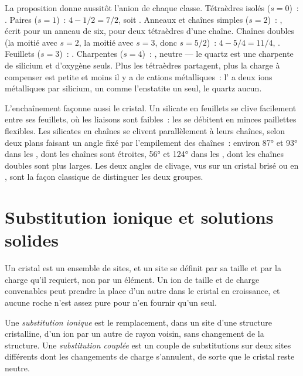 La proposition donne aussitôt l'anion de chaque classe. Tétraèdres isolés
($s = 0$)~: . Paires ($s = 1$)~: $4 - 1/2 = 7/2$, soit
. Anneaux et chaînes simples ($s = 2$)~: , écrit
 pour un anneau de six,  pour deux tétraèdres
d'une chaîne. Chaînes doubles (la moitié avec $s = 2$, la moitié avec $s = 3$,
donc $s = 5/2$)~: $4 - 5/4 = 11/4$, . Feuillets ($s = 3$)~:
. Charpentes ($s = 4$)~: , neutre --- le quartz est une
charpente de silicium et d'oxygène seuls. Plus les tétraèdres partagent, plus la
charge à compenser est petite et moins il y a de cations métalliques~: l'
 a deux ions métalliques par silicium, un  comme l'enstatite
 un seul, le quartz aucun.

L'enchaînement façonne aussi le cristal. Un silicate en feuillets se clive
facilement entre ses feuillets, où les liaisons sont faibles~: les  se
débitent en minces paillettes flexibles. Les silicates en chaînes se clivent
parallèlement à leurs chaînes, selon deux plans faisant un angle fixé par
l'empilement des chaînes~: environ \ang{87} et \ang{93} dans les , dont
les chaînes sont étroites, \ang{56} et \ang{124} dans les , dont les
chaînes doubles sont plus larges. Les deux angles de clivage, vus sur un cristal
brisé ou en , sont la façon classique de distinguer les deux groupes.

\section{Substitution ionique et solutions solides}

Un cristal est un ensemble de sites, et un site se définit par sa taille et par
la charge qu'il requiert, non par un élément. Un ion de taille et de charge
convenables peut prendre la place d'un autre dans le cristal en croissance, et
aucune roche n'est assez pure pour n'en fournir qu'un seul.

\begin{definition}\label{def:b1:rock-forming-minerals:substitution}
Une \emph{substitution ionique} est le remplacement, dans un site d'une structure
cristalline, d'un ion par un autre de rayon voisin, sans changement de la
structure. Une \emph{substitution couplée} est un couple de substitutions sur deux sites
différents dont les changements de charge s'annulent, de sorte que le cristal
reste neutre.
\end{definition}

